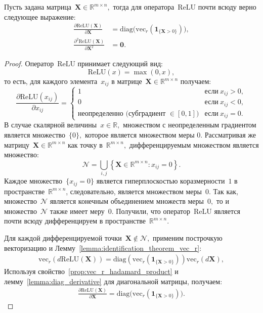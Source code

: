 \begin{theorem}\label{theorem:relu_derivative_hessian}
Пусть задана матрица~$\mathbf{X} \in \mathbb{R}^{m \times n},$ тогда для оператора~$\mathrm{ReLU}$ почти всюду верно следующее выражение:
\begin{align}
    \frac{\partial \mathrm{ReLU}(\mathbf{X})}{\partial \mathbf{X}} &= \mathrm{diag}\!\big(\mathrm{vec}_r(\mathbf{1}_{\{\mathbf{X}>0\}})\big), \\
    \frac{\partial^2 \mathrm{ReLU}(\mathbf{X})}{\partial \mathbf{X}^2} &= \mathbf{0}.
\end{align}
\end{theorem}
\begin{proof}
Оператор~$\mathrm{ReLU}$ принимает следующий вид:
\[
    \mathrm{ReLU}(x) = \max(0, x),
\]
то есть, для каждого элемента~$x_{ij}$ в матрице~$\mathbf{X} \in \mathbb{R}^{m \times n}$ получаем:
\[
    \frac{\partial \mathrm{ReLU}(x_{ij})}{\partial x_{ij}} =
    \begin{cases}
    1 & \text{если}~x_{ij} > 0, \\
    0 & \text{если}~x_{ij} < 0, \\
    \text{неопределенно (субградиент }\in[0,1]\text{)} & \text{если}~x_{ij} = 0.
    \end{cases}
\]
В случае скалярной величины~$x \in \mathbb{R},$ множеством с неопределенным градиентом является множество~$\{0\},$ которое является множеством меры 0.
Рассматривая же матрицу~$\mathbf{X} \in \mathbb{R}^{m \times n}$ как точку в~$\mathbb{R}^{m\times n},$ дифференцируемым множеством является множество:
\[
    \mathcal{N} = \bigcup_{i,j} \left\{ \mathbf{X} \in \mathbb{R}^{m \times n} : x_{ij} = 0 \right\}.
\]
Каждое множество~$\{x_{ij} = 0\}$ является гиперплоскостью коразмерности~$1$ в пространстве~$\mathbb{R}^{m\times n}$, следовательно, является множеством меры~$0$.
Так как, множество~$\mathcal{N}$ является конечным объединением множеств меры~$0,$ то и множество~$\mathcal{N}$ также имеет меру~$0.$ Получили, что оператор~$\mathrm{ReLU}$ является почти всюду дифференцируем в пространстве~$\mathbb{R}^{m \times n}.$

Для каждой дифференцируемой точки~$\mathbf{X} \notin \mathcal{N},$ применим построчкую векторизацию и Лемму~\ref{lemma:identification_theorem_vec_r}:
\begin{align}
    \mathrm{vec}_r(d\mathrm{ReLU}(\mathbf{X}))
    = \mathrm{diag}(\mathrm{vec}_r(\mathbf{1}_{\{\mathbf{X}>0\}}))  \mathrm{vec}_r(d\mathbf{X}),
\end{align}
Используя свойство~\ref{prop:vec_r_hadamard_product} и лемму~\ref{lemma:diag_derivative} для диагональной матрицы, получаем:
\begin{align}
    \frac{\partial \mathrm{ReLU}(\mathbf{X})}{\partial \mathbf{X}}
= \mathrm{diag}\!\big(\mathrm{vec}_r(\mathbf{1}_{\{\mathbf{X}>0\}})\big).
\end{align}


\end{proof}
